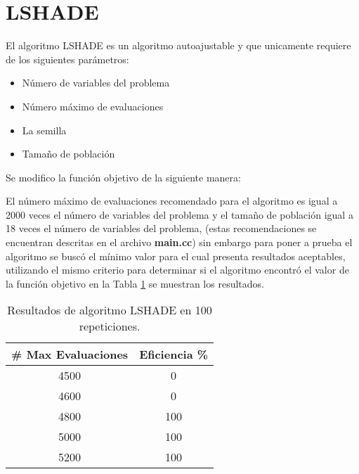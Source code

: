 \documentclass[conference]{IEEEtran}
\begin{document}
\section{LSHADE}

El algoritmo LSHADE es un algoritmo autoajustable y que unicamente requiere de los siguientes parámetros:

\begin{itemize}
\item Número de variables del problema
\item Número máximo de evaluaciones 
\item La semilla
\item Tamaño de población
\end{itemize}

Se modifico la función objetivo de la siguiente manera: 




El número máximo de evaluaciones recomendado para el algoritmo es igual a 2000 veces el número de variables del problema y el tamaño de población igual a 18 veces el número de variables del problema, (estas recomendaciones se encuentran descritas en el archivo \textbf{main.cc}) sin embargo para poner a prueba el algoritmo se buscó el mínimo valor para el cual presenta resultados aceptables, utilizando el mismo criterio para determinar si el algoritmo encontró el valor de la función objetivo en la Tabla \ref{tab:LSHADE} se muestran los resultados.

\begin{table}[h!]   
	\caption{Resultados de algoritmo LSHADE en 100 repeticiones.}                                                                                                                
		\centering                                       
		\begin{tabular}{cc}
			\hline                                             
			\#{} Max Evaluaciones & Eficiencia \% \\                     
			\hline 
			4500 & 0\\                                            
			4600 & 0\\
			4800 & 100\\
			5000 & 100\\
			5200 & 100\\
			\hline                                             
		\end{tabular}
		\label{tab:LSHADE}
	\end{table}	
\end{document}
